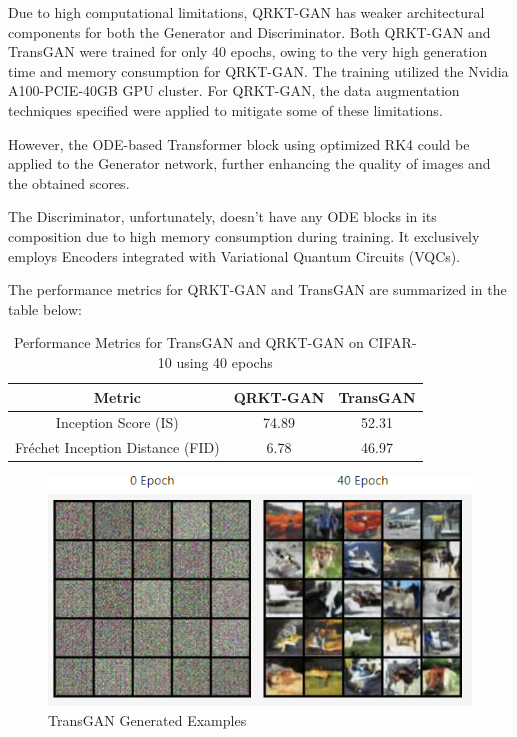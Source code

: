 \documentclass[12pt,a4paper]{report}
\begin{document}
Due to high computational limitations, QRKT-GAN has weaker architectural components for both the Generator and Discriminator. Both QRKT-GAN and TransGAN were trained for only 40 epochs, owing to the very high generation time and memory consumption for QRKT-GAN. The training utilized the Nvidia A100-PCIE-40GB GPU cluster. For QRKT-GAN, the data augmentation techniques specified were applied to mitigate some of these limitations.

However, the ODE-based Transformer block using optimized RK4 could be applied to the Generator network, further enhancing the quality of images and the obtained scores.

The Discriminator, unfortunately, doesn't have any ODE blocks in its composition due to high memory consumption during training. It exclusively employs Encoders integrated with Variational Quantum Circuits (VQCs).

The performance metrics for QRKT-GAN and TransGAN are summarized in the table below:

\begin{table}[h!]
  \centering
  \begin{tabular}{|c|c|c|}
    \hline
    \textbf{Metric}                  & \textbf{QRKT-GAN} & \textbf{TransGAN} \\
    \hline
    Inception Score (IS)             & 74.89             & 52.31             \\
    \hline
    Fréchet Inception Distance (FID) & 6.78             & 46.97             \\
    \hline
  \end{tabular}
  \caption{Performance Metrics for TransGAN and QRKT-GAN on CIFAR-10 using 40 epochs}
  \label{table:performance_metrics}
\end{table}

\begin{figure}[th]
  \centering
  \includegraphics[scale=0.88]{./pics/gan_gen.png}
  \caption[TransGAN Generated Examples]{TransGAN Generated Examples~\cite{ahmet_sarigun_2024_10806360}}
  \label{fig:p40}
\end{figure}
\end{document}
